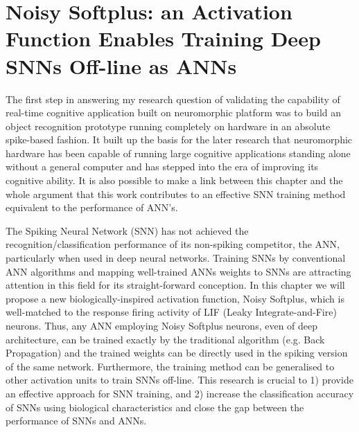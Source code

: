 \chapter{Noisy Softplus: an Activation Function Enables Training Deep SNNs Off-line as ANNs}
\label{cha:Conv}
The first step in answering my research question of validating the capability of real-time cognitive application built on neuromorphic platform was to build an object recognition prototype running completely on hardware in an absolute spike-based fashion.
It built up the basis for the later research that neuromorphic hardware has been capable of running large cognitive applications standing alone without a general computer and has stepped into the era of improving its cognitive ability.
It is also possible to make a link between this chapter and the whole argument that this work contributes to an effective SNN training method equivalent to the performance of ANN's.

The Spiking Neural Network (SNN) has not achieved the recognition/classification performance of its non-spiking competitor, the ANN, particularly when used in deep neural networks.
Training SNNs by conventional ANN algorithms and mapping well-trained ANNs weights to SNNs are attracting attention in this field for its straight-forward conception.
In this chapter we will propose a new biologically-inspired activation function, Noisy Softplus, which is well-matched to the response firing activity of LIF (Leaky Integrate-and-Fire) neurons.
Thus, any ANN employing Noisy Softplus neurons, even of deep architecture, can be trained exactly by the traditional algorithm (e.g. Back Propagation) and the trained weights can be directly used in the spiking version of the same network.
Furthermore, the training method can be generalised to other activation units to train SNNs off-line.
This research is crucial to 1) provide an effective approach for SNN training, and 2) increase the classification accuracy of SNNs using biological characteristics and close the gap between the performance of SNNs and ANNs.


